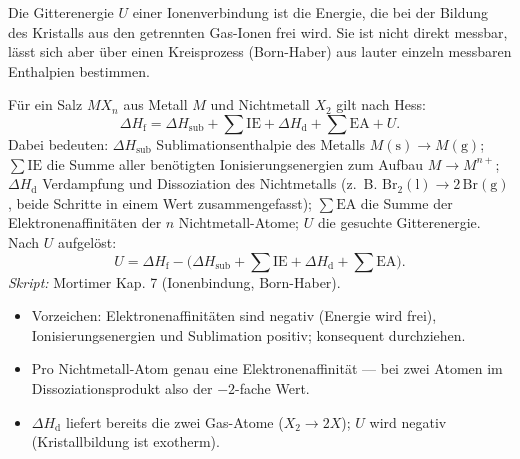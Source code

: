
Die Gitterenergie $U$ einer Ionenverbindung ist die Energie, die bei der
Bildung des Kristalls aus den getrennten Gas-Ionen frei wird. Sie ist nicht
direkt messbar, lässt sich aber über einen Kreisprozess (Born-Haber) aus
lauter einzeln messbaren Enthalpien bestimmen.

\begin{werkzeugkasten}
Für ein Salz $MX_n$ aus Metall $M$ und Nichtmetall $X_2$ gilt nach Hess:
\begin{equation}
  \Delta H_{\mathrm f} =
  \Delta H_{\mathrm{sub}} + \sum \mathrm{IE} + \Delta H_{\mathrm{d}} + \sum \mathrm{EA} + U .
\end{equation}
Dabei bedeuten: $\Delta H_{\mathrm{sub}}$ Sublimationsenthalpie des Metalls
$M(\mathrm s)\to M(\mathrm g)$; $\sum\mathrm{IE}$ die Summe aller benötigten
Ionisierungsenergien zum Aufbau $M\to M^{n+}$; $\Delta H_{\mathrm d}$ Verdampfung
und Dissoziation des Nichtmetalls (z.\ B. $\mathrm{Br_2(l)}\to 2\,\mathrm{Br(g)}$,
beide Schritte in einem Wert zusammengefasst); $\sum\mathrm{EA}$ die Summe der
Elektronenaffinitäten der $n$ Nichtmetall-Atome; $U$ die gesuchte Gitterenergie.
Nach $U$ aufgelöst:
\begin{equation}
  U = \Delta H_{\mathrm f} -
      \big(\Delta H_{\mathrm{sub}} + \sum\mathrm{IE} + \Delta H_{\mathrm d} + \sum\mathrm{EA}\big) .
\end{equation}
\textit{Skript:} Mortimer Kap. 7 (Ionenbindung, Born-Haber).
\end{werkzeugkasten}

\begin{achtung}
\begin{itemize}
  \item Vorzeichen: Elektronenaffinitäten sind negativ (Energie wird frei),
        Ionisierungsenergien und Sublimation positiv; konsequent durchziehen.
  \item Pro Nichtmetall-Atom genau eine Elektronenaffinität --- bei zwei Atomen
        im Dissoziationsprodukt also der $-2$-fache Wert.
  \item $\Delta H_{\mathrm d}$ liefert bereits die zwei Gas-Atome
        ($X_2\to 2X$); $U$ wird negativ (Kristallbildung ist exotherm).
\end{itemize}
\end{achtung}
